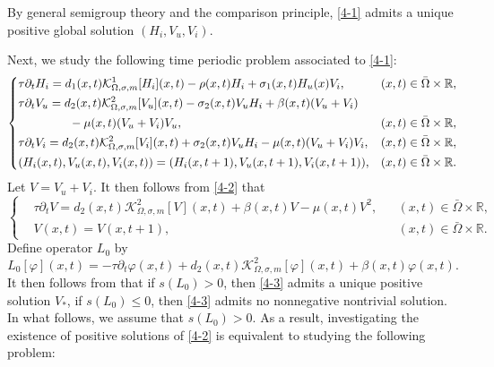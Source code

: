 \documentclass[11pt,reqno]{amsart}
\numberwithin{equation}{section}
\begin{document}
By general semigroup theory
\cite{Pazy} and the comparison principle, \eqref{4-1} admits a unique positive global solution $(H_{i}, V_{u}, V_{i})$.

Next, we study the following time periodic problem associated to \eqref{4-1}:
\begin{equation}\label{4-2}
\left\{
\begin{aligned}
&\tau \partial_{t} H_{i} =d_{1}(x,t)\mathcal{K}^{1}_{\Omega,\sigma,m}[H_{i}](x,t)-\rho(x,t)H_{i}+\sigma_{1}(x,t)H_{u}(x)V_{i}, &&(x,t)\in \bar\Omega\times \mathbb{R},\\
&\tau \partial_{t} V_{u}
=d_{2}(x,t)\mathcal{K}^{2}_{\Omega,\sigma,m}[V_{u}](x,t)-\sigma_{2}(x,t)V_{u}H_{i}+\beta(x,t)(V_{u}+V_{i})\\
&\hspace{1.5cm}-\mu(x,t)(V_{u}+V_{i})V_{u},&&(x,t)\in \bar\Omega\times \mathbb{R}, \\
&\tau \partial_{t} V_{i}
=d_{2}(x,t)\mathcal{K}^{2}_{\Omega,\sigma,m}[V_{i}](x,t)+\sigma_{2}(x,t)V_{u}H_{i}-\mu(x,t)(V_{u}+V_{i})V_{i},&&(x,t)\in \bar\Omega\times\mathbb{R},\\
&(H_{i}(x,t), V_{u}(x,t), V_{i}(x,t))=(H_{i}(x,t+1), V_{u}(x,t+1), V_{i}(x,t+1)),&&(x,t)\in \bar\Omega\times\mathbb{R}.
\end{aligned}
\right.
\end{equation}
Let $V=V_{u}+V_{i}$. It then follows from \eqref{4-2} that
\begin{equation}\label{4-3}
\left\{
\begin{aligned}
&\tau\partial_{t} V = d_{2}(x,t)\mathcal{K}^{2}_{\Omega,\sigma,m}[V](x,t) + \beta(x,t)V - \mu(x,t) V^{2}, &&(x,t)\in \bar\Omega\times\mathbb{R},\\
&V(x,t)= V(x,t+1), &&(x,t)\in \bar\Omega\times\mathbb{R}.
\end{aligned}
\right.
\end{equation}
Define operator $L_{0}$ by
\begin{equation*}
L_{0}[\varphi](x,t) = -\tau\partial_{t}\varphi(x,t)  + d_{2}(x,t)\mathcal{K}^{2}_{\Omega,\sigma,m}[\varphi](x,t) + \beta(x,t)\varphi(x,t).
\end{equation*}
It then follows from \cite{RS,ShenVo} that if $s(L_{0})>0$, then \eqref{4-3} admits a unique positive solution $V_{*}$,
if $s(L_{0}) \leq 0$, then
\eqref{4-3} admits no nonnegative nontrivial solution.
In what follows, we assume that $s(L_{0})>0$.
As a result, investigating the existence of positive solutions of \eqref{4-2} is equivalent to studying the following problem:
\end{document}
